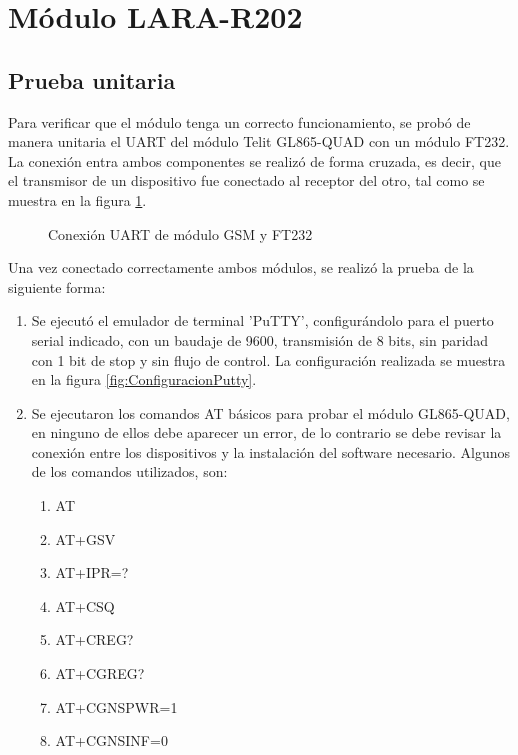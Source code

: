 \section{Módulo LARA-R202}
\subsection{Prueba unitaria}
Para verificar que el módulo tenga un correcto funcionamiento, se probó de manera unitaria el UART del módulo Telit GL865-QUAD con un módulo FT232. La conexión entra ambos componentes se realizó de forma cruzada, es decir, que el transmisor de un dispositivo fue conectado al receptor del otro, tal como se muestra en la figura \ref{fig:ConexionUART}.

	\begin{figure}[htbp!]
		\centering
		\caption{Conexión UART de módulo GSM y FT232}
		\label{fig:ConexionUART}
	\end{figure}
	
Una vez conectado correctamente ambos módulos, se realizó la prueba de la siguiente forma:
\begin{enumerate}
	\item Se ejecutó el emulador de terminal ’PuTTY’, configurándolo para el puerto serial
	indicado, con un baudaje de 9600, transmisión de 8 bits, sin paridad con 1 bit de
	stop y sin flujo de control. La configuración realizada se muestra en la figura \ref{fig:ConfiguracionPutty}.
	\item Se ejecutaron los comandos AT básicos para probar el módulo GL865-QUAD, en ninguno de ellos
	debe aparecer un error, de lo contrario se debe revisar la conexión entre los dispositivos
	y la instalación del software necesario. Algunos de los comandos utilizados, son:
		\begin{enumerate}
			\item AT
			\item AT+GSV
			\item AT+IPR=?
			\item AT+CSQ
			\item AT+CREG? 
			\item AT+CGREG? 
			\item AT+CGNSPWR=1
			\item AT+CGNSINF=0
		\end{enumerate}	
\end{enumerate}
 

